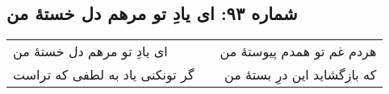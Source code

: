 \begin{center}
\section*{شماره ۹۳: ای یادِ تو مرهم دل خستۀ من}
\label{sec:093}
\begin{longtable}{l p{0.5cm} r}
ای یادِ تو مرهم دل خستهٔ من
&&
هردم غم تو همدم پیوستهٔ من
\\
گر تونکنی یاد به لطفی که تراست
&&
که بازگشاید این درِ بستهٔ من
\\
\end{longtable}
\end{center}
